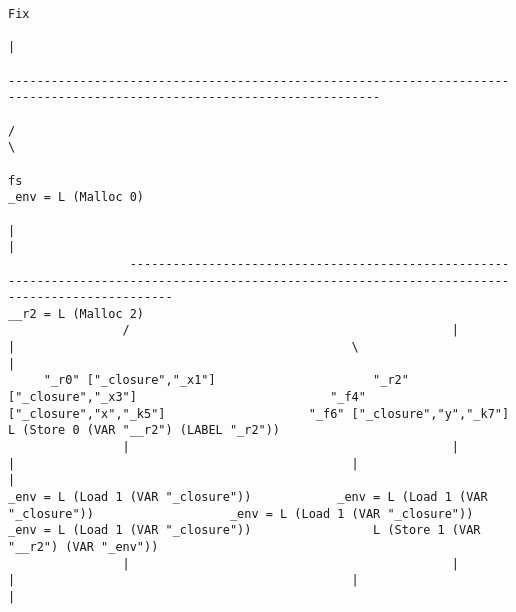 \begin{landscape}
\begin{lstlisting}[basicstyle=\fontsize{6}{7}\selectfont\ttfamily]
                                                                                                                         Fix
                                                                                                                          |
                                                                                              --------------------------------------------------------------------------------------------------------------------------
                                                                                             /                                                                                                                          \
                                                                                             fs                                                                                                                _env = L (Malloc 0)
                                                                                             |                                                                                                                          |
                 --------------------------------------------------------------------------------------------------------------------------------------------------                                            __r2 = L (Malloc 2)
                /                                             |                                                    |                                               \                                                    |
     "_r0" ["_closure","_x1"]                      "_r2" ["_closure","_x3"]                           "_f4" ["_closure","x","_k5"]                    "_f6" ["_closure","y","_k7"]                    L (Store 0 (VAR "__r2") (LABEL "_r2"))
                |                                             |                                                    |                                               |                                                    |
_env = L (Load 1 (VAR "_closure"))            _env = L (Load 1 (VAR "_closure"))                   _env = L (Load 1 (VAR "_closure"))              _env = L (Load 1 (VAR "_closure"))                 L (Store 1 (VAR "__r2") (VAR "_env"))
                |                                             |                                                    |                                               |                                                    |

\end{lstlisting}
\end{landscape}
